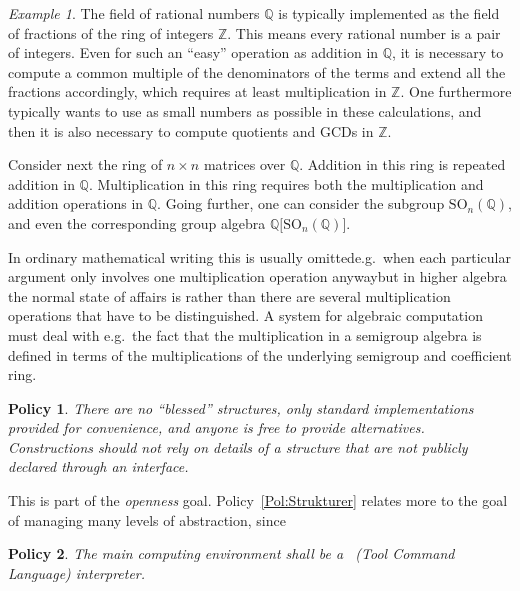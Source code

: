 \documentclass{mtmtcl}
\theoremstyle{plain}
\newtheorem{policy}{Policy}
\theoremstyle{remark}
\newtheorem*{example}{Example}
\begin{document}
\begin{example}
  The field of rational numbers $\mathbb{Q}$ is typically implemented 
  as the field of fractions of the ring of integers $\mathbb{Z}$. 
  This means every rational number is a pair of integers. Even for 
  such an ``easy'' operation as addition in $\mathbb{Q}$, it is 
  necessary to compute a common multiple of the denominators of the 
  terms and extend all the fractions accordingly, which requires at 
  least multiplication in $\mathbb{Z}$. One furthermore typically 
  wants to use as small numbers as possible in these calculations, 
  and then it is also necessary to compute quotients and GCDs in 
  $\mathbb{Z}$.
  
  Consider next the ring of $n \times n$ matrices over $\mathbb{Q}$. 
  Addition in this ring is repeated addition in $\mathbb{Q}$. 
  Multiplication in this ring requires both the multiplication and 
  addition operations in $\mathbb{Q}$. Going further, one can 
  consider the subgroup $\mathrm{SO}_n(\mathbb{Q})$, and even the 
  corresponding group algebra $\mathbb{Q}\bigl[ 
  \mathrm{SO}_n(\mathbb{Q}) \bigr]$.
\end{example}

In ordinary mathematical writing this 
is usually omitted\Ldash e.g.~when each particular argument only 
involves one multiplication operation anyway\Rdash but in higher 
algebra the normal state of affairs is rather than there are 
several multiplication operations that have to be distinguished. 
A system for algebraic computation must deal with e.g.~the fact 
that the multiplication in a semigroup algebra is defined in 
terms of the multiplications of the underlying semigroup and 
coefficient ring.

\begin{policy}
  There are no ``blessed'' structures, only standard implementations 
  provided for convenience, and anyone is free to provide 
  alternatives. Constructions should not rely on details of a 
  structure that are not publicly declared through an interface.
\end{policy}

This is part of the \emph{openness} goal. Policy~\ref{Pol:Strukturer} 
relates more to the goal of managing many levels of abstraction, 
since 


\begin{policy}
  The main computing environment shall be a \Tcl~(Tool Command 
  Language) interpreter.
\end{policy}
\end{document}
